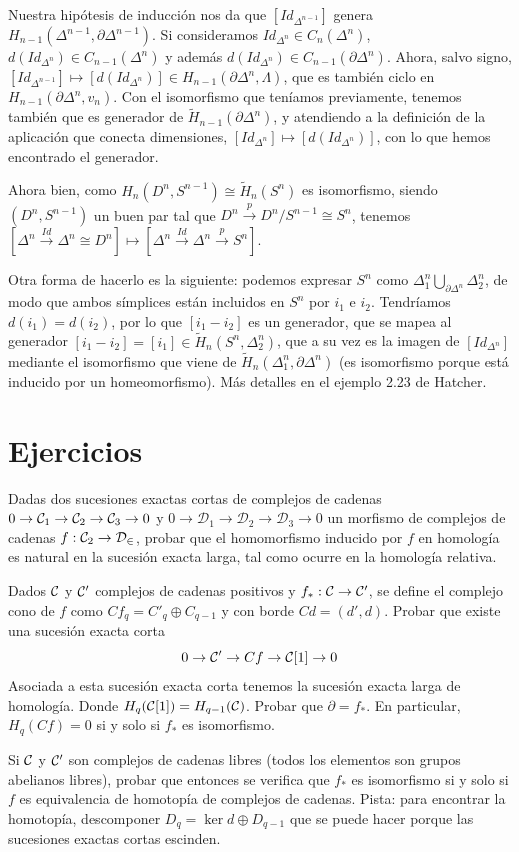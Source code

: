 \documentclass[TA.tex]{subfiles}
\begin{document}
\begin{ej}
Nuestra hipótesis de inducción nos da que $[Id_{\Delta^{n-1}}]$ genera $H_{n-1}(\Delta^{n-1},\partial\Delta^{n-1})$. Si consideramos $Id_{\Delta^n}\in C_n(\Delta^n)$, $d(Id_{\Delta^n})\in C_{n-1}(\Delta^n)$ y además $d(Id_{\Delta^n})\in C_{n-1}(\partial\Delta^n)$. Ahora, salvo signo, $[Id_{\Delta^{n-1}}]\mapsto [d(Id_{\Delta^n})]\in H_{n-1}(\partial\Delta^n,\Lambda)$, que es también ciclo en $H_{n-1}(\partial\Delta^n,v_n)$. Con el isomorfismo que teníamos previamente, tenemos también que es generador de $\widetilde{H}_{n-1}(\partial\Delta^n)$, y atendiendo a la definición de la aplicación que conecta dimensiones, $[Id_{\Delta^n}]\mapsto [d(Id_{\Delta^n})]$, con lo que hemos encontrado el generador. 


Ahora bien, como $H_n(D^n,S^{n-1})\cong \widetilde{H}_n(S^n)$ es isomorfismo, siendo $(D^n,S^{n-1})$ un buen par tal que $D^n\xrightarrow{p}D^n/S^{n-1}\cong S^n$, tenemos $[\Delta^n\xrightarrow{Id}\Delta^n\cong D^n]\mapsto [\Delta^n\xrightarrow{Id}\Delta^n\xrightarrow{p}S^n]$. 

Otra forma de hacerlo es la siguiente: podemos expresar $S^n$ como $\Delta^n_1\bigcup_{\partial\Delta^n}\Delta^n_2$, de modo que ambos símplices están incluidos en $S^n$ por $i_1$ e $i_2$. Tendríamos $d(i_1)=d(i_2)$, por lo que $[i_1-i_2]$ es un generador, que se mapea al generador $[i_1-i_2]=[i_1]\in \widetilde{H}_n(S^n,\Delta^n_2)$, que a su vez es la imagen de $[Id_{\Delta^n}]$ mediante el isomorfismo que viene de $\widetilde{H}_n(\Delta^n_1,\partial\Delta^n)$ (es isomorfismo porque está inducido por un homeomorfismo). Más detalles en el ejemplo 2.23 de Hatcher.
\end{ej}


\section{Ejercicios}
\begin{ejer}
Dadas dos sucesiones exactas cortas de complejos de cadenas $0\to \mathcal{C}_1\to \mathcal{C}_2\to\mathcal{C}_3\to 0$ y $0\to \mathcal{D}_1\to \mathcal{D}_2\to\mathcal{D}_3\to 0$ un morfismo de complejos de cadenas $f:\mathcal{C}_2\to\mathcal{D_2}$, probar que el homomorfismo inducido por $f$ en homología es natural en la sucesión exacta larga, tal como ocurre en la homología relativa. 
\end{ejer}

\begin{ejer}
Dados $\mathcal{C}$ y $\mathcal{C}'$ complejos de cadenas positivos y $f_*:\mathcal{C}\to\mathcal{C}'$, se define el complejo cono de $f$ como $Cf_q=C'_q\oplus C_{q-1}$ y con borde $Cd=(d',d)$. Probar que existe una sucesión exacta corta
\[
0\to \mathcal{C}'\to Cf\to \mathcal{C}[1]\to 0
\]
Asociada a esta sucesión exacta corta tenemos la sucesión exacta larga de homología. Donde $H_q(\mathcal{C}[1])=H_{q-1}(\mathcal{C})$. Probar que $\partial=f_*$. En particular, $H_q(Cf)=0$ si y solo si $f_*$ es isomorfismo. 

Si $\mathcal{C}$ y $\mathcal{C}'$ son complejos de cadenas libres (todos los elementos son grupos abelianos libres), probar que entonces se verifica que $f_*$ es isomorfismo si y solo si $f$ es equivalencia de homotopía de complejos de cadenas.  Pista: para encontrar la homotopía, descomponer $D_q=\ker d\oplus D_{q-1}$ que se puede hacer porque las sucesiones exactas cortas escinden. 
\end{ejer}
\end{document}
